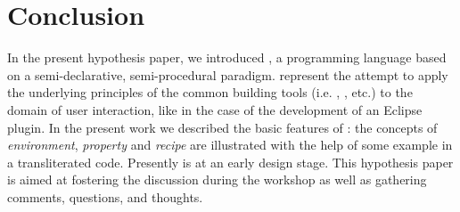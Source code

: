 \section{Conclusion}

In the present hypothesis paper, we introduced \Reap, a programming language 
based on a semi-declarative, semi-procedural paradigm. 
\Reap represent the attempt to apply the underlying principles of 
the common building tools (i.e. , , etc.) to the domain 
of user interaction, like in the case of the development of an Eclipse plugin.
In the present work we described the basic features of \Reap: the concepts
of \emph{environment}, \emph{property} and \emph{recipe} are illustrated
with the help of some example in a transliterated \Java code.
Presently \Reap is at an early design stage. This hypothesis paper
is aimed at fostering the discussion during the workshop as well as gathering 
comments, questions, and thoughts. 

% 
% 
% 
%    
% 
% 
% 
% 

